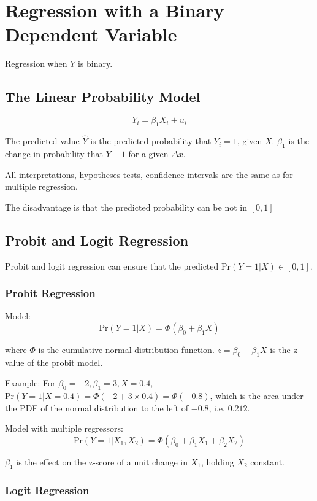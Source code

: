 \documentclass{article}
\begin{document}
\section{Regression with a Binary Dependent Variable}

Regression when $Y$ is binary.

\subsection{The Linear Probability Model}

\[
	Y_i = \beta_1 X_i + u_i
\]

The predicted value $\hat{Y}$ is the predicted probability that $Y_i=1$, given $X$.
$\beta_1$ is the change in probability that $Y-1$ for a given $\Delta x$.

All interpretations, hypotheses tests, confidence intervals are the same as for multiple regression.

The disadvantage is that the predicted probability can be not in $[0, 1]$

\subsection{Probit and Logit Regression}

Probit and logit regression can ensure that the predicted $\text{Pr}(Y=1|X) \in [0, 1]$.

\subsubsection{Probit Regression}

Model:
\[
	\text{Pr}(Y=1 | X) = \Phi(\beta_0 + \beta_1X)
\]

where $\Phi$ is the cumulative normal distribution function.
$z=\beta_0 + \beta_1X$ is the z-value of the probit model.

Example: For $\beta_0 = -2, \beta_1=3, X=0.4$, $\text{Pr}(Y=1 | X=0.4) = \Phi(-2 + 3 \times 0.4) = \Phi(-0.8)$,
which is the area under the PDF of the normal distribution to the left of $-0.8$, i.e. $0.212$.

Model with multiple regressors:
\[
	\text{Pr}(Y=1 | X_1, X_2) = \Phi(\beta_0 + \beta_1 X_1 + \beta_2 X_2)
\]

$\beta_1$ is the effect on the z-score of a unit change in $X_1$, holding $X_2$ constant.

\subsubsection{Logit Regression}
\end{document}
